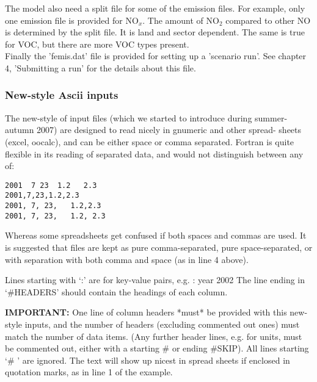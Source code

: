 The model also need a split file for some of the emission files.  For
example, only one emission file is provided for NO$_{x}$.  The amount of
NO$_{2}$ compared to other NO is determined by the split file.  It is
land and sector dependent.  The same is true for VOC, but
there are more VOC types present. \\ 

Finally the 'femis.dat' file is provided for setting up a 'scenario run'.  See
chapter 4, 'Submitting a run' for the details about this file.  

 
\bigskip
\subsubsection{New-style  Ascii inputs}
\label{sec:NewInputs}

 The new-style of  input files (which we started to introduce during summer-autumn 2007)
are designed to read nicely in gnumeric and other spread-
sheets (excel, oocalc), and can be either space or comma separated.
Fortran is quite flexible in its reading of separated data, and
would not distinguish between any of:
\begin{verbatim}
2001  7 23  1.2   2.3
2001,7,23,1.2,2.3
2001, 7, 23,   1.2,2.3
2001, 7, 23,   1.2, 2.3
\end{verbatim}

Whereas some spreadsheets get confused if both spaces and commas
are used. It is suggested that files are kept as 
pure comma-separated,
pure space-separated,
or with separation with both comma and space (as in line 4 above).
\bigskip

Lines starting with `:' are for key-value pairs, e.g. : year 2002
The line ending in `\#HEADERS' should contain the headings of each column.
\bigskip

{\bf IMPORTANT:} One line of column headers *must* be provided with this
new-style inputs, and the
 number of headers (excluding commented out ones)  must match the number of data items.
(Any further header lines, e.g. for units, must be commented out, either with
a starting \# or ending \#SKIP).
 All lines starting `\# ' are ignored. The text will show up nicest in
 spread sheets if enclosed in quotation marks, as in line 1 of the example.

